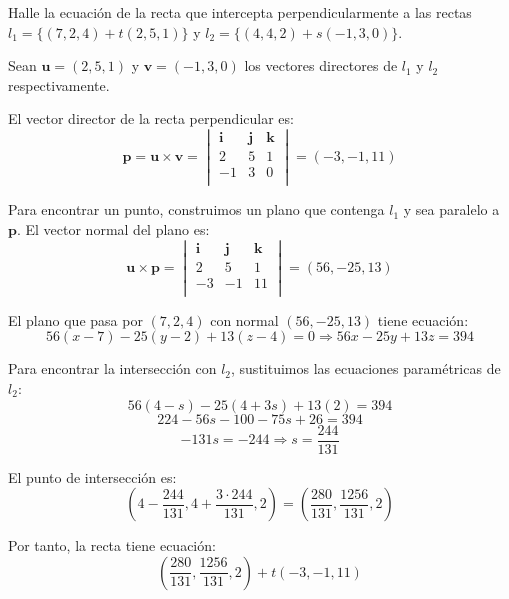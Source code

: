 \begin{prob} Halle la ecuación de la recta que intercepta perpendicularmente a las rectas $l_1=\{(7,2,4)+t(2,5,1)\}$ y $l_2=\{(4,4,2)+s(-1,3,0)\}$.

\begin{myproof}	

Sean $\mathbf{u}=(2,5,1)$ y $\mathbf{v}=(-1,3,0)$ los vectores directores de $l_1$ y $l_2$ respectivamente.

El vector director de la recta perpendicular es:
$$\mathbf{p} = \mathbf{u} \times \mathbf{v} =
\begin{vmatrix}
\mathbf{i} & \mathbf{j} & \mathbf{k} \\
2 & 5 & 1 \\
-1 & 3 & 0 \\
\end{vmatrix} =
(-3, -1, 11)$$

Para encontrar un punto, construimos un plano que contenga $l_1$ y sea paralelo a $\mathbf{p}$. El vector normal del plano es:
$$\mathbf{u} \times \mathbf{p} =
\begin{vmatrix}
\mathbf{i} & \mathbf{j} & \mathbf{k} \\
2 & 5 & 1 \\
-3 & -1 & 11 \\
\end{vmatrix} =
(56, -25, 13)$$

El plano que pasa por $(7,2,4)$ con normal $(56,-25,13)$ tiene ecuación:
$$56(x-7)-25(y-2)+13(z-4)=0 \Rightarrow 56x-25y+13z=394$$

Para encontrar la intersección con $l_2$, sustituimos las ecuaciones paramétricas de $l_2$:
$$56(4-s)-25(4+3s)+13(2)=394$$
$$224-56s-100-75s+26=394$$
$$-131s=-244 \Rightarrow s=\frac{244}{131}$$

El punto de intersección es:
$$\left(4-\frac{244}{131}, 4+\frac{3 \cdot 244}{131}, 2\right) = \left(\frac{280}{131}, \frac{1256}{131}, 2\right)$$

Por tanto, la recta tiene ecuación:
$$\left(\frac{280}{131}, \frac{1256}{131}, 2\right) + t(-3,-1,11)$$

\end{myproof}
\end{prob}

